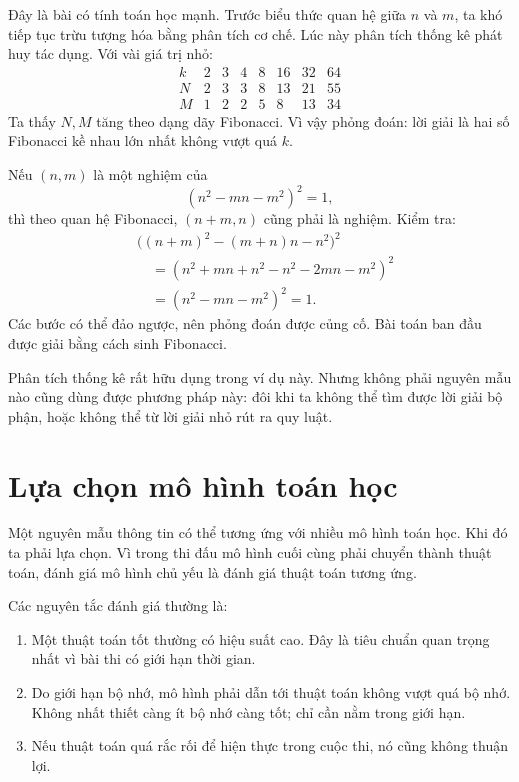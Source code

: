 \documentclass[11pt]{article}
\begin{document}
Đây là bài có tính toán học mạnh. Trước biểu thức quan hệ giữa \(n\) và \(m\),
ta khó tiếp tục trừu tượng hóa bằng phân tích cơ chế. Lúc này phân tích thống
kê phát huy tác dụng. Với vài giá trị nhỏ:
\[
\begin{array}{c|rrrrrrr}
k & 2&3&4&8&16&32&64\\ \hline
N & 2&3&3&8&13&21&55\\
M & 1&2&2&5&8&13&34
\end{array}
\]
Ta thấy \(N,M\) tăng theo dạng dãy Fibonacci. Vì vậy phỏng đoán: lời giải là
hai số Fibonacci kề nhau lớn nhất không vượt quá \(k\).

Nếu \((n,m)\) là một nghiệm của
\[
  (n^2-mn-m^2)^2=1,
\]
thì theo quan hệ Fibonacci, \((n+m,n)\) cũng phải là nghiệm. Kiểm tra:
\[
\begin{aligned}
&\bigl((n+m)^2-(m+n)n-n^2\bigr)^2\\
&\quad=(n^2+mn+n^2-n^2-2mn-m^2)^2\\
&\quad=(n^2-mn-m^2)^2=1.
\end{aligned}
\]
Các bước có thể đảo ngược, nên phỏng đoán được củng cố. Bài toán ban đầu được
giải bằng cách sinh Fibonacci.

Phân tích thống kê rất hữu dụng trong ví dụ này. Nhưng không phải nguyên mẫu
nào cũng dùng được phương pháp này: đôi khi ta không thể tìm được lời giải bộ
phận, hoặc không thể từ lời giải nhỏ rút ra quy luật.

\section{Lựa chọn mô hình toán học}

Một nguyên mẫu thông tin có thể tương ứng với nhiều mô hình toán học. Khi đó
ta phải lựa chọn. Vì trong thi đấu mô hình cuối cùng phải chuyển thành thuật
toán, đánh giá mô hình chủ yếu là đánh giá thuật toán tương ứng.

Các nguyên tắc đánh giá thường là:
\begin{enumerate}
  \item {} Một thuật toán tốt thường có hiệu suất
  cao. Đây là tiêu chuẩn quan trọng nhất vì bài thi có giới hạn thời gian.
  \item {} Do giới hạn bộ nhớ, mô hình phải dẫn
  tới thuật toán không vượt quá bộ nhớ. Không nhất thiết càng ít bộ nhớ càng
  tốt; chỉ cần nằm trong giới hạn.
  \item {} Nếu thuật toán quá rắc rối để hiện thực
  trong cuộc thi, nó cũng không thuận lợi.
\end{enumerate}
\end{document}
